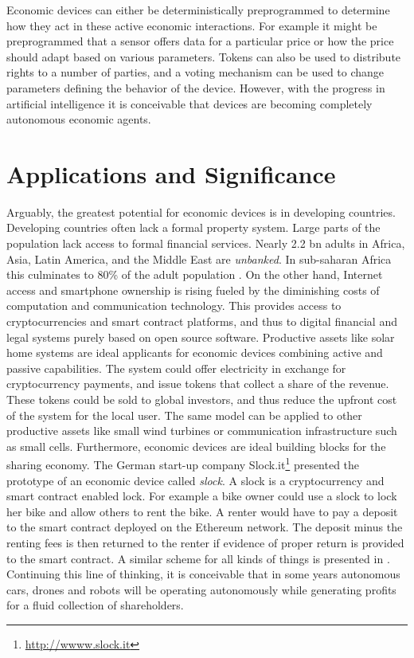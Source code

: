 Economic devices can either be deterministically preprogrammed to determine how they act in these active economic interactions. For example it might be preprogrammed that a sensor offers data for a particular price or how the price should adapt based on various parameters. Tokens can also be used to distribute rights to a number of parties, and a voting mechanism can be used to change parameters defining the behavior of the device. However, with the progress in artificial intelligence it is conceivable that devices are becoming completely autonomous economic agents. 

\section{Applications and Significance} 

Arguably, the greatest potential for economic devices is in developing countries. Developing countries often lack a formal property system. Large parts of the population lack access to formal financial services. Nearly 2.2 bn adults in Africa, Asia, Latin America, and the Middle East are \emph{unbanked}. In sub-saharan Africa this culminates to 80\% of the adult population \parencite{chaia2010counting}. On the other hand, Internet access and smartphone ownership is rising \parencite{poushter2016smartphone} fueled by the diminishing costs of computation and communication technology. This provides access to cryptocurrencies and smart contract platforms, and thus to digital financial and legal systems purely based on open source software.
Productive assets like solar home systems are ideal applicants for economic devices combining active and passive capabilities. The system could offer electricity in exchange for cryptocurrency payments, and issue tokens that collect a share of the revenue. These tokens could be sold to global investors, and thus reduce the upfront cost of the system for the local user. The same model can be applied to other productive assets like small wind turbines or communication infrastructure such as small cells. 
Furthermore, economic devices are ideal building blocks for the sharing economy. The German start-up company Slock.it\footnote{\url{http://wwww.slock.it}} presented the prototype of an economic device called \emph{slock}. A slock is a cryptocurrency and smart contract enabled lock. For example a bike owner could use a slock to lock her bike and allow others to rent the bike. A renter would have to pay a deposit to the smart contract deployed on the Ethereum network. The deposit minus the renting fees is then returned to the renter if evidence of proper return is provided to the smart contract. A similar scheme for all kinds of things is presented in \parencite{Bogner:2016:DSA:2991561.2998465}. 
Continuing this line of thinking, it is conceivable that in some years autonomous cars, drones and robots will be operating autonomously while generating profits for a fluid collection of shareholders.

